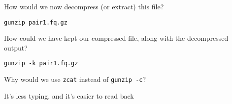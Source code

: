 \begin{questions}
How would we now decompress (or extract) this file?\\
\begin{answer}
\texttt{gunzip  pair1.fq.gz}\\
\end{answer}

How could we have kept our compressed file, along with the decompressed output?\\
\begin{answer}
\texttt{gunzip -k pair1.fq.gz}\\
\end{answer}

Why would we use \texttt{zcat} instead of \texttt{gunzip -c}?\\
\begin{answer}
It's less typing, and it's easier to read back
\end{answer}
\end{questions}


